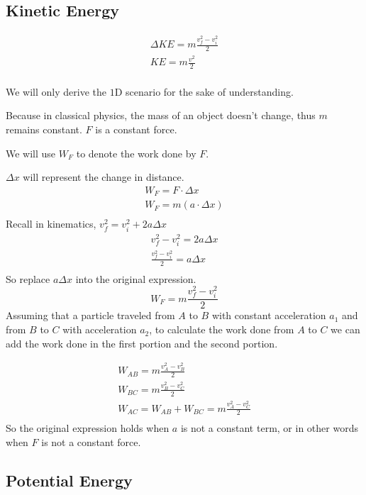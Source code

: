 \documentclass[]{article}
\begin{document}
	\subsection{Kinetic Energy}\label{subsec:kinetic-energy}
\begin{gather*}
	    \Delta KE = m \frac{v_f^2 - v^2_i}{2}\\
	    KE = m\frac{v^2}{2}\\
	\end{gather*}

	We will only derive the $1$D scenario for the sake of understanding. 
	
	Because in classical physics, the mass of an object doesn't change, thus $m$ remains constant.
	$F$ is a constant force.
	
	We will use $W_F$ to denote the work done by $F$.
	
	$\Delta x$ will represent the change in distance.
	\begin{gather*}
	    W_F = F \cdot \Delta x\\
	    W_F = m (a \cdot \Delta x)\\
	\end{gather*}
	Recall in kinematics, $v_f^2 = v^2_i + 2a\Delta x$
	\begin{gather*}
	    v_f^2 - v^2_i = 2a\Delta x\\
	    \frac{v_f^2 - v^2_i}{2} = a\Delta x\\
	\end{gather*}
	So replace $a\Delta x$ into the original expression.
	\[W_F = m \frac{v_f^2 - v^2_i}{2}\]
	Assuming that a particle traveled from $A$ to $B$ with constant acceleration $a_1$ and from $B$ to $C$ with acceleration $a_2$, to calculate the work done from $A$ to $C$ we can add the work done in the first portion and the second portion.
	
	\begin{gather*}
	    W_{AB} = m\frac{v_A^2 -v_B^2}{2}\\
	    W_{BC} = m\frac{v_B^2 -v_C^2}{2}\\
	    W_{AC} = W_{AB} + W_{BC} = m\frac{v_A^2 -v_C^2}{2}\\
	\end{gather*}
	So the original expression holds when $a$ is not a constant term, or in other words when $F$ is not a constant force. 
	\subsection{Potential Energy}\label{subsec:potential-energy}
\end{document}
